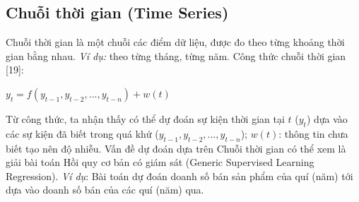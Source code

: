 \documentclass[12pt]{extarticle}
\begin{document}
		\subsection{Chuỗi thời gian (Time Series)}
			\par Chuỗi thời gian là một chuỗi các điểm dữ liệu, được đo theo từng khoảng thời gian bằng nhau. \textit{Ví dụ:} theo từng tháng, từng năm. Công thức chuỗi thời gian [19]:
			\begin{center}
				$y_{t}=f(y_{t-1},y_{t-2},...,y_{t-n}) + w(t)$
			\end{center}
			\par Từ công thức, ta nhận thấy có thể dự đoán sự kiện thời gian tại $t$ ($y_{t}$) dựa vào các sự kiện đã biết trong quá khứ ($y_{t-1},y_{t-2},...,y_{t-n}$); $w(t)$: thông tin chưa biết tạo nên độ nhiễu. Vấn đề dự đoán dựa trên Chuỗi thời gian có thể xem là giải bài toán Hồi quy cơ bản có giám sát (Generic Supervised Learning Regression). \textit{Ví dụ}: Bài toán dự đoán doanh số bán sản phẩm của quí (năm) tới dựa vào doanh số bán của các quí (năm) qua.
\end{document}
